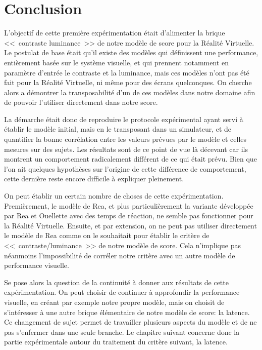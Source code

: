 \chapter*{Conclusion}
\par L'objectif de cette première expérimentation était d'alimenter la brique <<~contraste luminance~>> de notre modèle de score pour la Réalité Virtuelle. Le postulat de base était qu'il existe des modèles qui définissent une performance, entièrement basée sur le système visuelle, et qui prennent notamment en paramètre d'entrée le contraste et la luminance, mais ces modèles n'ont pas été fait pour la Réalité Virtuelle, ni même pour des écrans quelconques. On cherche alors a démontrer la transposabilité d'un de ces modèles dans notre domaine afin de pouvoir l'utiliser directement dans notre score.

\par La démarche était donc de reproduire le protocole expérimental ayant servi à établir le modèle initial, mais en le transposant  dans un simulateur, et de quantifier la bonne corrélation entre les valeurs prévues par le modèle et celles mesures sur des sujets. Les résultats sont de ce point de vue là décevant car ils montrent un comportement radicalement différent de ce qui était prévu. Bien que l'on ait quelques hypothèses sur l'origine de cette différence de comportement, cette dernière reste encore difficile à expliquer pleinement.

\par On peut établir un certain nombre de choses de cette expérimentation. Premièrement, le modèle de Rea, et plus particulièrement la variante développée par Rea et Ouellette avec des temps de réaction, ne semble pas fonctionner pour la Réalité Virtuelle. Ensuite, et par extension, on ne peut pas utiliser directement le modèle de Rea comme on le souhaitait pour établir le critère de <<~contraste/luminance~>> de notre modèle de score. Cela n'implique pas néanmoins l'impossibilité de corréler notre critère avec un autre modèle de performance visuelle.

\par Se pose alors la question de la continuité à donner aux résultats de cette expérimentation. On peut choisir de continuer à approfondir la performance visuelle, en créant par exemple notre propre modèle, mais on choisit de s'intéresser à une autre brique élémentaire de notre modèle de score: la latence. Ce changement de sujet permet de travailler plusieurs aspects du modèle et de ne pas s'enfermer dans une seule branche. Le chapitre suivant concerne donc la partie expérimentale autour du traitement du critère suivant, la latence.